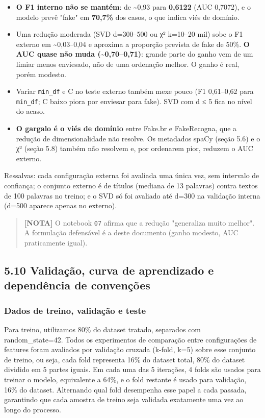 \documentclass[
  brazilian,
  11pt,
]{article}
\providecommand{\tightlist}{%
  \setlength{\itemsep}{0pt}\setlength{\parskip}{0pt}}
\begin{document}
\begin{itemize}
\tightlist
\item
  \textbf{O F1 interno não se mantém}: de \textasciitilde0,93 para \textbf{0,6122} (AUC 0,7072), e o modelo prevê "fake" em \textbf{70,7\%} dos casos, o que indica viés de domínio.
\item
  Uma redução moderada (SVD d=300--500 ou χ² k=10--20 mil) sobe o F1 externo em \textasciitilde0,03--0,04 e aproxima a proporção prevista de fake de 50\%. \textbf{O AUC quase não muda (\textasciitilde0,70--0,71)}: grande parte do ganho vem de um limiar menos enviesado, não de uma ordenação melhor. O ganho é real, porém modesto.
\item
  Variar \texttt{min\_df} e C no teste externo também mexe pouco (F1 0,61--0,62 para \texttt{min\_df}; C baixo piora por enviesar para fake). SVD com d ≤ 5 fica no nível do acaso.
\item
  \textbf{O gargalo é o viés de domínio} entre Fake.br e FakeRecogna, que a redução de dimensionalidade não resolve. Os metadados spaCy (seção 5.6) e o χ² (seção 5.8) também não resolvem e, por ordenarem pior, reduzem o AUC externo.
\end{itemize}

Ressalvas: cada configuração externa foi avaliada uma única vez, sem intervalo de confiança; o conjunto externo é de títulos (mediana de 13 palavras) contra textos de 100 palavras no treino; e o SVD só foi avaliado até d=300 na validação interna (d=500 aparece apenas no externo).

\begin{quote}
\textbf{{[}NOTA{]}} O notebook \texttt{07} afirma que a redução "generaliza muito melhor". A formulação defensável é a deste documento (ganho modesto, AUC praticamente igual).
\end{quote}

\subsection{5.10 Validação, curva de aprendizado e dependência de convenções}\label{validauxe7uxe3o-curva-de-aprendizado-e-dependuxeancia-de-convenuxe7uxf5es}

\subsubsection{Dados de treino, validação e teste}\label{dados-de-treino-validauxe7uxe3o-e-teste}

Para treino, utilizamos 80\% do dataset tratado, separados com random\_state=42. Todos os experimentos de comparação entre configurações de features foram avaliados por validação cruzada (k-fold, k=5) sobre esse conjunto de treino, ou seja, cada fold representa 16\% do dataset total, 80\% do dataset dividido em 5 partes iguais. Em cada uma das 5 iterações, 4 folds são usados para treinar o modelo, equivalente a 64\%, e o fold restante é usado para validação, 16\% do dataset. Alternando qual fold desempenha esse papel a cada passada, garantindo que cada amostra de treino seja validada exatamente uma vez ao longo do processo.
\end{document}
